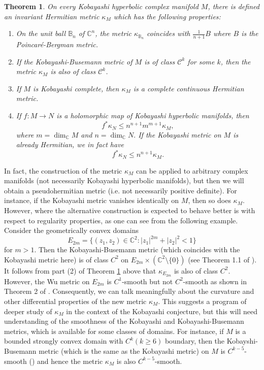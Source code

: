 \documentclass[a4paper,11pt,reqno]{amsart}
\theoremstyle{plain}
\newtheorem{theorem}[equation]{Theorem}
\theoremstyle{definition}
\theoremstyle{remark}
\theoremstyle{remark}
\numberwithin{equation}{section}
\newcommand{\cx}{{\mathbb C}}
\newcommand{\B}{{\mathbb B}}
\begin{document}
\begin{theorem}
    \label{thm-main}
    On every Kobayashi hyperbolic complex manifold $M$, there is 
    defined an invariant Hermitian metric $\kappa_M$ which has the following properties:
    \begin{enumerate}
     
        \item On the unit ball $\B_n$ of $\cx^n$, the metric $\kappa_{\B_n}$ coincides with ${ \frac{1}{n+1} B}$
        where $B$ is the Poincar\'{e}-Bergman metric.

\item 
If the Kobayashi-Busemann metric of $M$ is of class $\mathcal{C}^k$ for some $k$, then the metric $\kappa_M$ is also of class $\mathcal{C}^k$.
        
        \item If $M$ is Kobayashi complete, then $\kappa_M$ is a complete continuous
        Hermitian metric.
        \item If $f:M\to N$ is a holomorphic map of Kobayashi hyperbolic manifolds, then 
                \[ f^*\kappa_N \leq n^{n+1}m^{m+1} \kappa_M, \]
where $m=\dim_\cx M$ and $n=\dim_\cx N.$ If the Kobayashi metric on $ M$ is already Hermitian, we in fact have
    \[f^*\kappa_N\leq n^{n+1}\kappa_M. \]
 
    \end{enumerate}
\end{theorem}
 In fact, the construction of the metric $\kappa_M$ can be applied to arbitrary complex manifolds (not necessarily Kobayashi hyperbolic manifolds), but then we will obtain a pseudohermitian metric (i.e. not necessarily positive definite). For instance, if the Kobayashi metric vanishes identically on $ M $, then so does $ \kappa_M $. However, where the alternative construction 
 is expected to behave better is with respect to regularity properties, as one can see from the following example. Consider the geometrically convex domains 
\[
E_{2m}= \{ (z_1, z_2) \in \mathbb{C}^2: |z_1|^{2m} + |z_2|^2 < 1 \} 
\]  
for $ m > 1 $. Then the Kobayashi-Busemann metric (which coincides with the Kobayashi metric here) is of class $ C^2 $ on $ E_{2m} \times (\mathbb{C}^2 \setminus \{0\} ) $ (see Theorem 1.1 of \cite{Ma}). It follows from part (2) of  Theorem \ref{thm-main} above that $ \kappa_{E_{2m}} $ is also of class $ C^2 $.
However, the Wu metric on $ E_{2m} $ is $ C^1$-smooth but not $ C^2$-smooth as shown in Theorem 2 of \cite{cheungkim1}. Consequently,
we can talk meaningfully about the curvature and other differential properties of the new metric $\kappa_M$.
This suggests a program of deeper study of $\kappa_M$ in the context of the Kobayashi conjecture, but this will need
understanding of the smoothness of the Kobayashi and Kobayashi-Busemann metrics, which is available for some 
classes of domains. 
 For instance, if $ M $ is a bounded strongly convex domain with $ C^k (k \geq 6) $ boundary, then the Kobayshi-Busemann metric (which is the same as the Kobayashi metric) on $ M $ is $ C^{k-5}$-smooth (\cite{Lempert}) and hence the metric $ \kappa_M $ is also $ C^{k-5}$-smooth.
\end{document}

